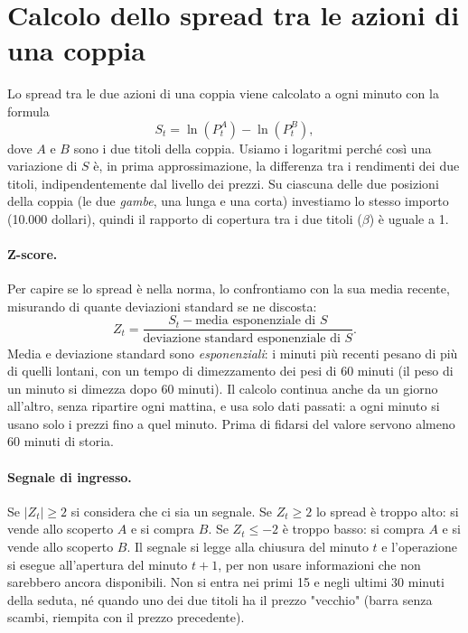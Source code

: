 \documentclass[11pt,a4paper]{article}
\begin{document}
\section{Calcolo dello spread tra le azioni di una coppia}
Lo spread tra le due azioni di una coppia viene calcolato a ogni minuto con la formula
\begin{equation}
  S_t = \ln(P^{A}_t) - \ln(P^{B}_t),
\end{equation}
dove $A$ e $B$ sono i due titoli della coppia. Usiamo i logaritmi perché così una variazione di $S$ è, in prima approssimazione, la differenza tra i rendimenti dei due titoli, indipendentemente dal livello dei prezzi. Su ciascuna delle due posizioni della coppia (le due \emph{gambe}, una lunga e una corta) investiamo lo stesso importo (10.000 dollari), quindi il rapporto di copertura tra i due titoli ($\beta$) è uguale a 1.

\paragraph{Z-score.} Per capire se lo spread è nella norma, lo confrontiamo con la sua media recente, misurando di quante deviazioni standard se ne discosta:
\begin{equation}
  Z_t = \frac{S_t - \text{media esponenziale di } S}{\text{deviazione standard esponenziale di } S}.
\end{equation}
Media e deviazione standard sono \emph{esponenziali}: i minuti più recenti pesano di più di quelli lontani, con un tempo di dimezzamento dei pesi di 60 minuti (il peso di un minuto si dimezza dopo 60 minuti). Il calcolo continua anche da un giorno all'altro, senza ripartire ogni mattina, e usa solo dati passati: a ogni minuto si usano solo i prezzi fino a quel minuto. Prima di fidarsi del valore servono almeno 60 minuti di storia.

\paragraph{Segnale di ingresso.} Se $|Z_t| \ge 2$ si considera che ci sia un segnale. Se $Z_t \ge 2$ lo spread è troppo alto: si vende allo scoperto $A$ e si compra $B$. Se $Z_t \le -2$ è troppo basso: si compra $A$ e si vende allo scoperto $B$. Il segnale si legge alla chiusura del minuto $t$ e l'operazione si esegue all'apertura del minuto $t+1$, per non usare informazioni che non sarebbero ancora disponibili. Non si entra nei primi 15 e negli ultimi 30 minuti della seduta, né quando uno dei due titoli ha il prezzo "vecchio" (barra senza scambi, riempita con il prezzo precedente).
\end{document}
